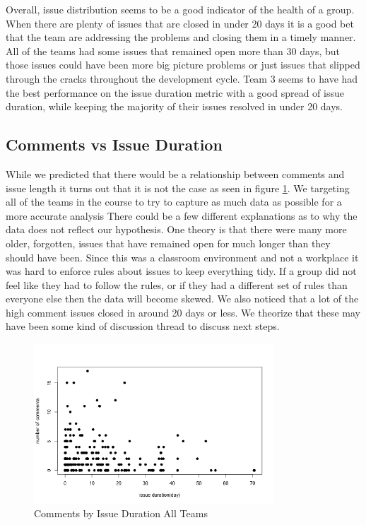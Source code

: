 \documentclass[conference]{IEEEtran}
\begin{document}
Overall, issue distribution seems to be a good indicator of the health of a group. When there are plenty of issues that are closed in under 20 days it is a good bet that the team are addressing the problems and closing them in a timely manner. All of the teams had some issues that remained open more than 30 days, but those issues could have been more big picture problems or just issues that slipped through the cracks throughout the development cycle. Team 3 seems to have had the best performance on the issue duration metric with a good spread of issue duration, while keeping the majority of their issues resolved in under 20 days. 

\subsection{Comments vs Issue Duration}
While we predicted that there would be a relationship between comments and issue length it turns out that it is not the case as seen in figure \ref{comments_duration_all}. We targeting all of the teams in the course to try to capture as much data as possible for a more accurate analysis There could be a few different explanations as to why the data does not reflect our hypothesis. One theory is that there were many more older, forgotten, issues that have remained open for much longer than they should have been. Since this was a classroom environment and not a workplace it was hard to enforce rules about issues to keep everything tidy. If a group did not feel like they had to follow the rules, or if they had a different set of rules than everyone else then the data will become skewed. We also noticed that a lot of the high comment issues closed in around 20 days or less. We theorize that these may have been some kind of discussion thread to discuss next steps. 
\begin{figure}[H]
    \centering
    \includegraphics[width=9cm]{../AprilProject/pic/comments_and_issue_duration_all.png}
    \caption{Comments by Issue Duration All Teams}
    \label{comments_duration_all}
\end{figure}
\end{document}
